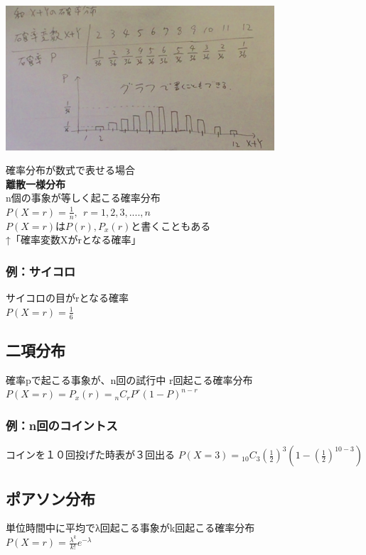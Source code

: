 \documentclass{jsarticle}
\begin{document}
		\begin{center}
			\includegraphics[width=10cm]{10_19_3.JPG}
		\end{center}
		確率分布が数式で表せる場合\\
		{\bf{離散一様分布}}\\
		n個の事象が等しく起こる確率分布\\
		$P(X=r)=\frac{1}{n} ,\ \  r=1,2,3,....,n$\\
		$P(X=r)はP(r),P_x(r)$と書くこともある\\
		↑「確率変数Xがrとなる確率」\\
		\subsubsection{例：サイコロ}
			サイコロの目がrとなる確率\\
			$P(X=r)=\frac{1}{6}$ \\
			
	\subsection{二項分布}
		確率pで起こる事象が、n回の試行中 r回起こる確率分布\\
		$P(X=r)=P_x(r)={}_n C _r P^r(1-P)^{n-r} $\\
		
		\subsubsection{例：n回のコイントス}
			コインを１０回投げた時表が３回出る
			$P(X=3)={}_{10}C_3 (\frac{1}{2})^3(1-(\frac{1}{2})^{10-3})$
			
	\subsection{ポアソン分布}
		単位時間中に平均でλ回起こる事象がk回起こる確率分布 \\
		$P(X=r)=\frac{λ^k}{k!} e^{-λ}$
		
\end{document}
